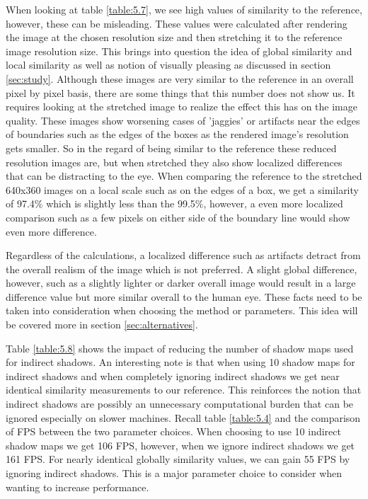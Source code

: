 When looking at table \ref{table:5.7}, we see high values of similarity to the reference, however, these can be misleading.  These values were calculated after rendering the image at the chosen resolution size and then stretching it to the reference image resolution size.  This brings into question the idea of global similarity and local similarity as well as notion of visually pleasing as discussed in section \ref{sec:study}.  Although these images are very similar to the reference in an overall pixel by pixel basis, there are some things that this number does not show us.  It requires looking at the stretched image to realize the effect this has on the image quality.  These images show worsening cases of 'jaggies' or artifacts near the edges of boundaries such as the edges of the boxes as the rendered image's resolution gets smaller.  So in the regard of being similar to the reference these reduced resolution images are, but when stretched they also show localized differences that can be distracting to the eye.  When comparing the reference to the stretched 640x360 images on a local scale such as on the edges of a box, we get a similarity of 97.4\% which is slightly less than the 99.5\%, however, a even more localized comparison such as a few pixels on either side of the boundary line would show even more difference.

Regardless of the calculations, a localized difference such as artifacts detract from the overall realism of the image which is not preferred.  A slight global difference, however, such as a slightly lighter or darker overall image would result in a large difference value but more similar overall to the human eye.  These facts need to be taken into consideration when choosing the method or parameters.  This idea will be covered more in section \ref{sec:alternatives}.

Table \ref{table:5.8} shows the impact of reducing the number of shadow maps used for indirect shadows.  An interesting note is that when using 10 shadow maps for indirect shadows and when completely ignoring indirect shadows we get near identical similarity measurements to our reference.  This reinforces the notion that indirect shadows are possibly an unnecessary computational burden that can be ignored especially on slower machines.  Recall table \ref{table:5.4} and the comparison of FPS between the two parameter choices.  When choosing to use 10 indirect shadow maps we get 106 FPS, however, when we ignore indirect shadows we get 161 FPS.  For nearly identical globally similarity values, we can gain 55 FPS by ignoring indirect shadows.  This is a major parameter choice to consider when wanting to increase performance.

